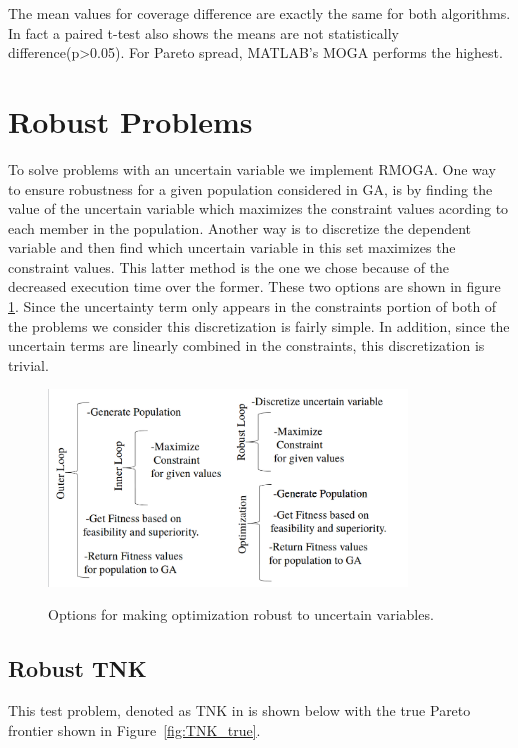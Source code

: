 \documentclass{article}
\begin{document}
\noindent The mean values for coverage difference are exactly the same for both algorithms. In fact a paired t-test also shows the means are not statistically difference(p>0.05). For Pareto spread, MATLAB's MOGA performs the highest.
\newpage
\section{Robust Problems} 
To solve problems with an uncertain variable we implement RMOGA.  One way to ensure robustness for a given population considered in GA, is by finding the value of the uncertain variable which maximizes the constraint values acording to each member in the population.  Another way is to discretize the dependent variable and then find which uncertain variable in this set maximizes the constraint values.  This latter method is the one we chose because of the decreased execution time over the former.  These two options are shown in figure \ref{fig:discretize}.
   Since the uncertainty term only appears in the constraints portion of both of the problems we consider this discretization is fairly simple.  In addition, since the uncertain terms are linearly combined in the constraints, this discretization is trivial.


\begin{figure}[H]
  \caption{Options for making optimization robust to uncertain variables. }
  \centering
  \includegraphics[width=0.85\textwidth]{Robustness.png}  
  \label{fig:discretize}
\end{figure}


 
\subsection{Robust TNK} 
This test problem, denoted as TNK in \cite{deb2001multi} is shown below with the true Pareto frontier shown in Figure~\ref{fig:TNK_true}.
\end{document}
